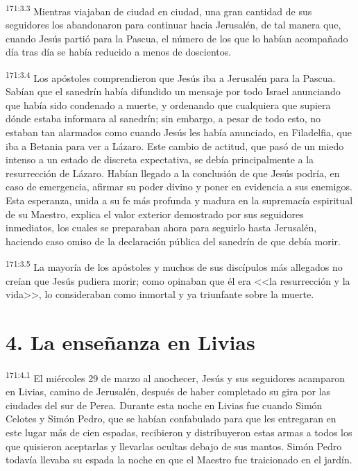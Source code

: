 \par 
\textsuperscript{171:3.3} Mientras viajaban de ciudad en ciudad, una gran cantidad de sus seguidores los abandonaron para continuar hacia Jerusalén, de tal manera que, cuando Jesús partió para la Pascua, el número de los que lo habían acompañado día tras día se había reducido a menos de doscientos.

\par 
\textsuperscript{171:3.4} Los apóstoles comprendieron que Jesús iba a Jerusalén para la Pascua. Sabían que el sanedrín había difundido un mensaje por todo Israel anunciando que había sido condenado a muerte, y ordenando que cualquiera que supiera dónde estaba informara al sanedrín; sin embargo, a pesar de todo esto, no estaban tan alarmados como cuando Jesús les había anunciado, en Filadelfia, que iba a Betania para ver a Lázaro. Este cambio de actitud, que pasó de un miedo intenso a un estado de discreta expectativa, se debía principalmente a la resurrección de Lázaro. Habían llegado a la conclusión de que Jesús podría, en caso de emergencia, afirmar su poder divino y poner en evidencia a sus enemigos. Esta esperanza, unida a su fe más profunda y madura en la supremacía espiritual de su Maestro, explica el valor exterior demostrado por sus seguidores inmediatos, los cuales se preparaban ahora para seguirlo hasta Jerusalén, haciendo caso omiso de la declaración pública del sanedrín de que debía morir.

\par 
\textsuperscript{171:3.5} La mayoría de los apóstoles y muchos de sus discípulos más allegados no creían que Jesús pudiera morir; como opinaban que él era <<la resurrección y la vida>>, lo consideraban como inmortal y ya triunfante sobre la muerte.

\section*{4. La enseñanza en Livias}
\par 
\textsuperscript{171:4.1} El miércoles 29 de marzo al anochecer, Jesús y sus seguidores acamparon en Livias, camino de Jerusalén, después de haber completado su gira por las ciudades del sur de Perea. Durante esta noche en Livias fue cuando Simón Celotes y Simón Pedro, que se habían confabulado para que les entregaran en este lugar más de cien espadas, recibieron y distribuyeron estas armas a todos los que quisieron aceptarlas y llevarlas ocultas debajo de sus mantos. Simón Pedro todavía llevaba su espada la noche en que el Maestro fue traicionado en el jardín.

